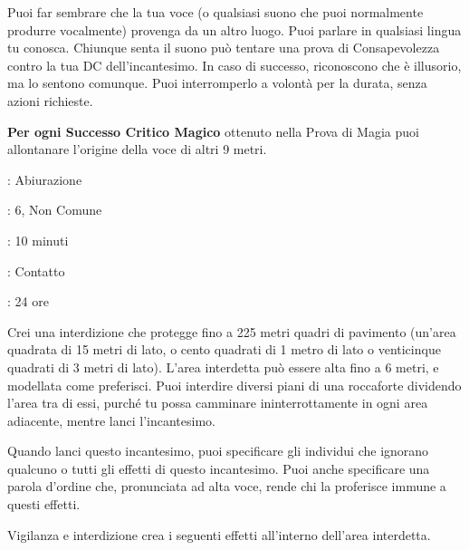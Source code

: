 \begin{multicols}{2}
Puoi far sembrare che la tua voce (o qualsiasi suono che puoi normalmente produrre vocalmente) provenga da un altro luogo. Puoi parlare in qualsiasi lingua tu conosca. Chiunque senta il suono può tentare una prova di Consapevolezza contro la tua DC dell'incantesimo. In caso di successo, riconoscono che è illusorio, ma lo sentono comunque. Puoi interromperlo a volontà per la durata, senza azioni richieste.

\textbf{Per ogni Successo Critico Magico} ottenuto nella Prova di Magia puoi allontanare l'origine della voce di altri 9 metri.

\noindent\colorbox{OBSSgold!10}{
\begin{minipage}{0.95\linewidth}
\begin{description}[noitemsep, topsep=0pt, parsep=0pt, partopsep=0pt, leftmargin=0cm, labelwidth=1.3cm]
	\item[\textbf{Lista}]: Abiurazione
	\item[\textbf{Livello}]: 6, Non Comune
	\item[\textbf{Lancio}]: 10 minuti
	\item[\textbf{Gittata}]: Contatto
	\item[\textbf{Durata}]: 24 ore
\end{description}
\end{minipage}}\smallskip

Crei una interdizione che protegge fino a 225 metri quadri di pavimento (un'area quadrata di 15 metri di lato, o cento quadrati di 1 metro di lato o venticinque quadrati di 3 metri di lato). L'area interdetta può essere alta fino a 6 metri, e modellata come preferisci. Puoi interdire diversi piani di una roccaforte dividendo l'area tra di essi, purché tu possa camminare ininterrottamente in ogni area adiacente, mentre lanci l'incantesimo.

Quando lanci questo incantesimo, puoi specificare gli individui che ignorano qualcuno o tutti gli effetti di questo incantesimo. Puoi anche specificare una parola d'ordine che, pronunciata ad alta voce, rende chi la proferisce immune a questi effetti.

Vigilanza e interdizione crea i seguenti effetti all'interno dell'area interdetta.

\begin{itemize}[leftmargin=*] \setlength{\itemsep}{0pt}


\end{itemize}
\end{multicols}
